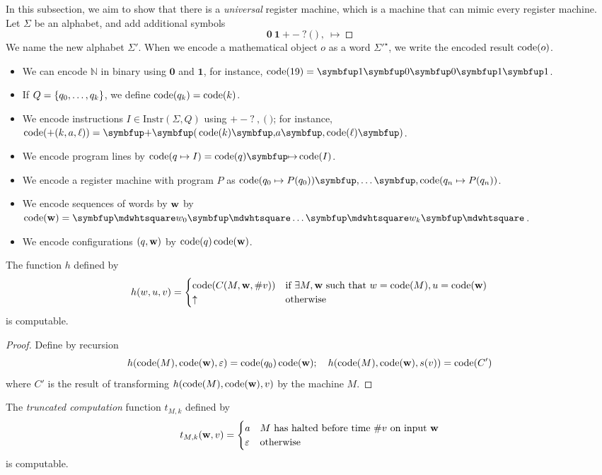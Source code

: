 In this subsection, we aim to show that there is a \emph{universal} register machine, which is a machine that can mimic every register machine.
Let \( \Sigma \) be an alphabet, and add additional symbols
\[ \bm 0\ \bm 1\ \bm +\ \bm -\ \bm ?\ \bm (\ \bm )\ \bm ,\ \bm \mapsto\ \bm \mdwhtsquare \]
We name the new alphabet \( \Sigma' \).
When we encode a mathematical object \( o \) as a word \( \Sigma'^\star \), we write the encoded result \( \operatorname{code}(o) \).
\begin{itemize}
	\item We can encode \( \mathbb N \) in binary using \( \bm 0 \) and \( \bm 1 \), for instance, \( \code(19) = \bm 1 \bm 0 \bm 0 \bm 1 \bm 1 \).
	\item If \( Q = \qty{q_0, \dots, q_k} \), we define \( \operatorname{code}(q_k) = \operatorname{code}(k) \).
	\item We encode instructions \( I \in \mathrm{Instr}(\Sigma, Q) \) using \( \bm +\ \bm -\ \bm ?\ \bm ,\ \bm (\ \bm ) \); for instance, \( \code(+(k,a,\ell)) = \bm +\bm(\code(k)\bm , a\bm ,\code(\ell)\bm ) \).
	\item We encode program lines by \( \code(q \mapsto I) = \code(q) \bm \mapsto \code(I) \).
	\item We encode a register machine with program \( P \) as \( \code(q_0 \mapsto P(q_0)) \bm , \ldots \bm , \code(q_n \mapsto P(q_n)) \).
	\item We encode sequences of words by \( \vb w \) by \( \code(\vb w) = \bm\mdwhtsquare w_0 \bm\mdwhtsquare \ldots \bm\mdwhtsquare w_k \bm\mdwhtsquare \).
	\item We encode configurations \( (q, \vb w) \) by \( \operatorname{code}(q)\operatorname{code}(\vb w) \).
\end{itemize}
\begin{lemma}
	The function \( h \) defined by
	\[ h(w,u,v) = \begin{cases}
		\operatorname{code}(C(M,\vb w,\# v)) & \text{if } \exists M, \vb w \text{ such that } w = \operatorname{code}(M), u = \operatorname{code}(\vb w) \\
		\uparrow & \text{otherwise}
	\end{cases} \]
	is computable.
\end{lemma}
\begin{proof}
	Define by recursion
	\[ h(\operatorname{code}(M), \operatorname{code}(\vb w), \varepsilon) = \operatorname{code}(q_0)\operatorname{code}(\vb w);\quad h(\operatorname{code}(M), \operatorname{code}(\vb w), s(v)) = \operatorname{code}(C') \]
	where \( C' \) is the result of transforming \( h(\operatorname{code}(M), \operatorname{code}(\vb w), v) \) by the machine \( M \).
\end{proof}
\begin{corollary}
	The \emph{truncated computation} function \( t_{M,k} \) defined by
	\[ t_{M,k}(\vb w, v) = \begin{cases}
		a & M \text{ has halted before time } \#v \text{ on input } \vb w \\
		\varepsilon & \text{otherwise}
	\end{cases} \]
	is computable.
\end{corollary}
